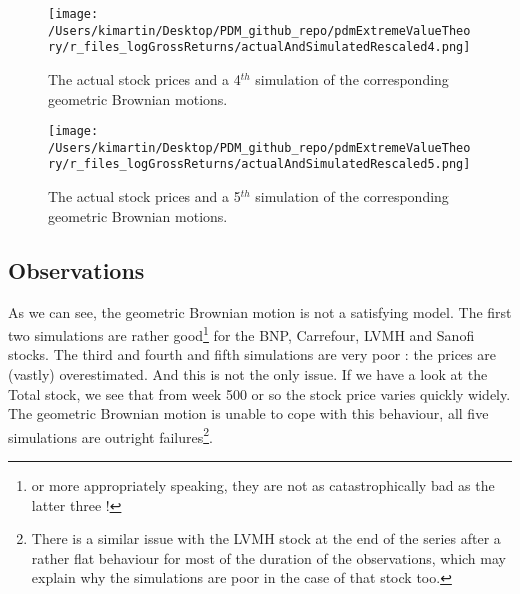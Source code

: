 \newpage
\begin{figure}[h!]
	\centering
	\texttt{[image: /Users/kimartin/Desktop/PDM\_github\_repo/pdmExtremeValueTheory/r\_files\_logGrossReturns/actualAndSimulatedRescaled4.png]}
	\caption{The actual stock prices and a 4$^{th}$ simulation of the corresponding geometric Brownian motions.}
	\label{fig:ActualAndManySimulatedGeomBMs4}
\end{figure}
\newpage
\begin{figure}[h!]
	\centering
	\texttt{[image: /Users/kimartin/Desktop/PDM\_github\_repo/pdmExtremeValueTheory/r\_files\_logGrossReturns/actualAndSimulatedRescaled5.png]}
	\caption{The actual stock prices and a 5$^{th}$ simulation of the corresponding geometric Brownian motions.}
	\label{fig:ActualAndManySimulatedGeomBMs5}
\end{figure}
\clearpage
\subsection{Observations}
As we can see, the geometric Brownian motion is not a satisfying model. The first two simulations are rather good\footnote{or more appropriately speaking, they are not as catastrophically bad as the latter three !} for the BNP, Carrefour, LVMH and Sanofi stocks. The third and fourth and fifth simulations are very poor : the prices are (vastly) overestimated. And this is not the only issue. If we have a look at the Total stock, we see that from week 500 or so the stock price varies quickly widely. The geometric Brownian motion is unable to cope with this behaviour, all five simulations are outright failures\footnote{There is a similar issue with the LVMH stock at the end of the series after a rather flat behaviour for most of the duration of the observations, which may explain why the simulations are poor in the case of that stock too.}.
